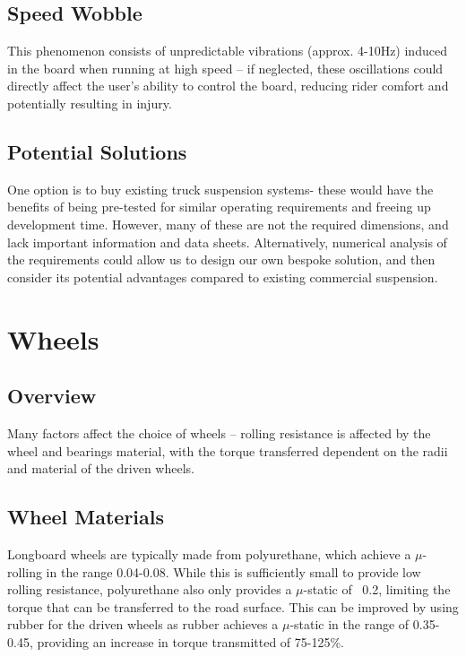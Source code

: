 \documentclass[journal,10pt]{IEEEtran}
\begin{document}
    \subsection{Speed Wobble}
        This phenomenon consists of unpredictable vibrations (approx. 4-10Hz) induced in the board when running at high speed – if neglected, these oscillations could directly affect the user’s ability to control the board, reducing rider comfort and potentially resulting in injury. 
    \subsection{Potential Solutions}
        One option is to buy existing truck suspension systems- these would have the benefits of being pre-tested for similar operating requirements and freeing up development time. However, many of these are not the required dimensions, and lack important information and data sheets. Alternatively, numerical analysis of the requirements could allow us to design our own bespoke solution, and then consider its potential advantages compared to existing commercial suspension. 
\section{Wheels}
    \subsection{Overview}
        Many factors affect the choice of wheels – rolling resistance is affected by the wheel and bearings material, with the torque transferred dependent on the radii and material of the driven wheels.
    \subsection{Wheel Materials}
        Longboard wheels are typically made from polyurethane, which achieve a $\mu$-rolling in the range 0.04-0.08. While this is sufficiently small to provide low rolling resistance, polyurethane also only provides a $\mu$-static of ~0.2, limiting the torque that can be transferred to the road surface. This can be improved by using rubber for the driven wheels as rubber achieves a $\mu$-static in the range of 0.35-0.45, providing an increase in torque transmitted of 75-125\%.
\end{document}
